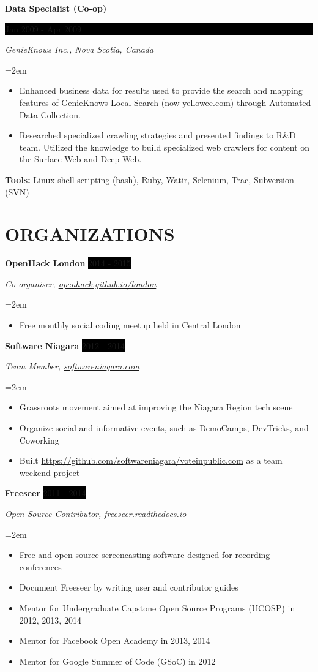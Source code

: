 \documentclass[paper=a4,fontsize=11pt]{scrartcl} %
\newcommand{\sepspace}{\vspace*{1em}}     %
\newcommand{\NewPart}[1]{\section*{\uppercase{#1}}}
\newcommand{\EducationEntry}[4]{
    \noindent \textbf{#1} \hfill        %
    \colorbox{Black}{
      \parbox{8.5em}{
      \hfill\color{White}#2}} \par      %
    \noindent \textit{#3} \par          %
    \noindent\hangindent=2em\hangafter=0 \small #4 %
    \normalsize \par}
\newcommand{\WorkEntry}[4]{             %
    \noindent \textbf{#1} \hfill        %
    \colorbox{Black}{%
      \parbox{9em}{%
      \hfill\color{White}#2}} \par      %
        \noindent \textit{#3} \par      %
    \noindent\hangindent=2em\hangafter=0 \small #4 %
    \normalsize \par}
\newcommand{\OrganizationEntry}[4]{         %
    \noindent \textbf{#1} \hfill            %
    \colorbox{Black}{\color{White}#2} \par  %
    \noindent \textit{#3} \par              %
    \noindent\hangindent=2em\hangafter=0 \small #4 %
    \normalsize \par}
\begin{document}
\WorkEntry{Data Specialist (Co-op)}{Jan 2009 - Apr 2009}
{GenieKnows Inc., Nova Scotia, Canada}
{
 \begin{itemize} \itemsep -1pt
   \item Enhanced business data for results used to provide the search and
         mapping features of GenieKnows Local Search (now yellowee.com)
         through Automated Data Collection.
   \item Researched specialized crawling strategies and presented findings to
         R\&D team. Utilized the knowledge to build specialized web
         crawlers for content on the Surface Web and Deep Web.
 \end{itemize}
 \textbf{Tools:} Linux shell scripting (bash), Ruby, Watir, Selenium, Trac, Subversion (SVN)
}

\NewPart{Organizations}{}

\OrganizationEntry{OpenHack London}{2014 - 2015} %
{Co-organiser, \href{https://openhack.github.io/london/}{openhack.github.io/london}}
{
  \begin{itemize} \itemsep -1pt
    \item Free monthly social coding meetup held in Central London
  \end{itemize}
}
\sepspace

\OrganizationEntry{Software Niagara}{2012 - 2014}
{Team Member, \href{https://www.softwareniagara.com/}{softwareniagara.com}}
{
 \begin{itemize} \itemsep -1pt
   \item Grassroots movement aimed at improving the Niagara Region tech scene
   \item Organize social and informative events, such as DemoCamps, DevTricks, and Coworking
   \item Built \url{https://github.com/softwareniagara/voteinpublic.com} as a team weekend project
 \end{itemize}
}
\sepspace

\OrganizationEntry{Freeseer}{2011 - 2014}
{Open Source Contributor, \href{http://freeseer.readthedocs.io/}{freeseer.readthedocs.io}}
{
 \begin{itemize} \itemsep -1pt %
   \item Free and open source screencasting software designed for recording conferences
   \item Document Freeseer by writing user and contributor guides
   \item Mentor for Undergraduate Capstone Open Source Programs (UCOSP) in 2012, 2013, 2014
   \item Mentor for Facebook Open Academy in 2013, 2014
   \item Mentor for Google Summer of Code (GSoC) in 2012
 \end{itemize}
}
\sepspace
\end{document}
